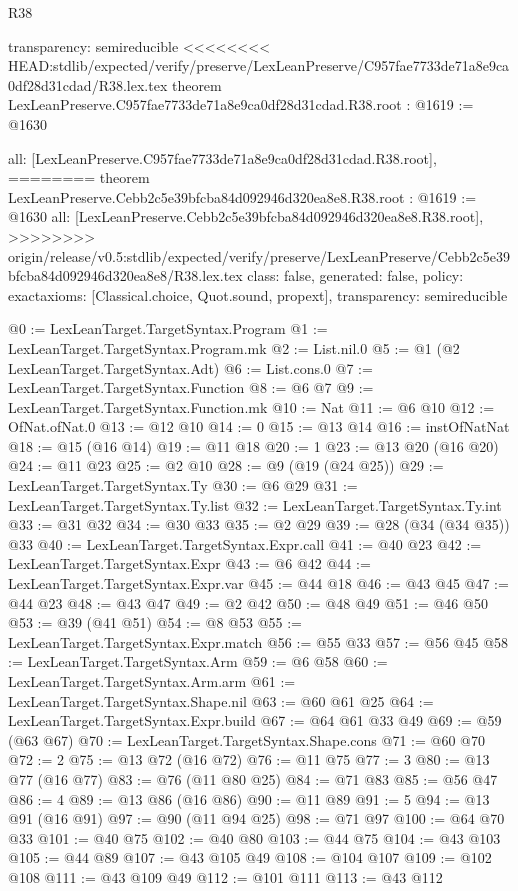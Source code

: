 \begin{lexlean}{R38}
\begin{coremodule}
{{{{{{{{{{{{  transparency: semireducible
}
<<<<<<<< HEAD:stdlib/expected/verify/preserve/LexLeanPreserve/C957fae7733de71a8e9ca0df28d31cdad/R38.lex.tex
theorem LexLeanPreserve.C957fae7733de71a8e9ca0df28d31cdad.R38.root : @1619 := @1630 {
  all: [LexLeanPreserve.C957fae7733de71a8e9ca0df28d31cdad.R38.root],
========
theorem LexLeanPreserve.Cebb2c5e39bfcba84d092946d320ea8e8.R38.root : @1619 := @1630 {
  all: [LexLeanPreserve.Cebb2c5e39bfcba84d092946d320ea8e8.R38.root],
>>>>>>>> origin/release/v0.5:stdlib/expected/verify/preserve/LexLeanPreserve/Cebb2c5e39bfcba84d092946d320ea8e8/R38.lex.tex
  class: false,
  generated: false,
  policy: exact{axioms: [Classical.choice, Quot.sound, propext]},
  transparency: semireducible
}

@0 := LexLeanTarget.TargetSyntax.Program
@1 := LexLeanTarget.TargetSyntax.Program.mk
@2 := List.nil.{0}
@5 := @1 (@2 LexLeanTarget.TargetSyntax.Adt)
@6 := List.cons.{0}
@7 := LexLeanTarget.TargetSyntax.Function
@8 := @6 @7
@9 := LexLeanTarget.TargetSyntax.Function.mk
@10 := Nat
@11 := @6 @10
@12 := OfNat.ofNat.{0}
@13 := @12 @10
@14 := 0
@15 := @13 @14
@16 := instOfNatNat
@18 := @15 (@16 @14)
@19 := @11 @18
@20 := 1
@23 := @13 @20 (@16 @20)
@24 := @11 @23
@25 := @2 @10
@28 := @9 (@19 (@24 @25))
@29 := LexLeanTarget.TargetSyntax.Ty
@30 := @6 @29
@31 := LexLeanTarget.TargetSyntax.Ty.list
@32 := LexLeanTarget.TargetSyntax.Ty.int
@33 := @31 @32
@34 := @30 @33
@35 := @2 @29
@39 := @28 (@34 (@34 @35)) @33
@40 := LexLeanTarget.TargetSyntax.Expr.call
@41 := @40 @23
@42 := LexLeanTarget.TargetSyntax.Expr
@43 := @6 @42
@44 := LexLeanTarget.TargetSyntax.Expr.var
@45 := @44 @18
@46 := @43 @45
@47 := @44 @23
@48 := @43 @47
@49 := @2 @42
@50 := @48 @49
@51 := @46 @50
@53 := @39 (@41 @51)
@54 := @8 @53
@55 := LexLeanTarget.TargetSyntax.Expr.match
@56 := @55 @33
@57 := @56 @45
@58 := LexLeanTarget.TargetSyntax.Arm
@59 := @6 @58
@60 := LexLeanTarget.TargetSyntax.Arm.arm
@61 := LexLeanTarget.TargetSyntax.Shape.nil
@63 := @60 @61 @25
@64 := LexLeanTarget.TargetSyntax.Expr.build
@67 := @64 @61 @33 @49
@69 := @59 (@63 @67)
@70 := LexLeanTarget.TargetSyntax.Shape.cons
@71 := @60 @70
@72 := 2
@75 := @13 @72 (@16 @72)
@76 := @11 @75
@77 := 3
@80 := @13 @77 (@16 @77)
@83 := @76 (@11 @80 @25)
@84 := @71 @83
@85 := @56 @47
@86 := 4
@89 := @13 @86 (@16 @86)
@90 := @11 @89
@91 := 5
@94 := @13 @91 (@16 @91)
@97 := @90 (@11 @94 @25)
@98 := @71 @97
@100 := @64 @70 @33
@101 := @40 @75
@102 := @40 @80
@103 := @44 @75
@104 := @43 @103
@105 := @44 @89
@107 := @43 @105 @49
@108 := @104 @107
@109 := @102 @108
@111 := @43 @109 @49
@112 := @101 @111
@113 := @43 @112
}}}}}}}}}}}}
\end{coremodule}
\end{lexlean}
